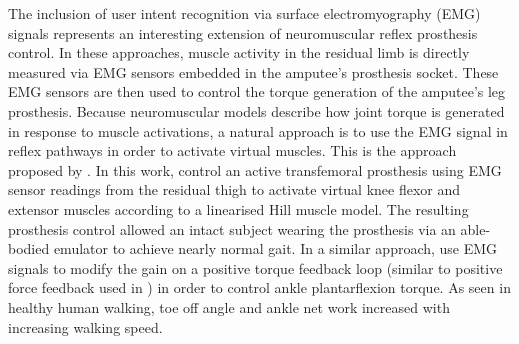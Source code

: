 The inclusion of user intent recognition via surface electromyography (EMG)
signals represents an interesting extension of neuromuscular reflex prosthesis
control. In these approaches, muscle activity in the residual limb is directly
measured via EMG sensors embedded in the amputee's prosthesis socket. These EMG
sensors are then used to control the torque generation of the amputee's leg
prosthesis. Because neuromuscular models describe how joint torque is generated
in response to muscle activations, a natural approach is to use the EMG signal
in reflex pathways in order to activate virtual muscles. This is the approach
proposed by \citet{wu2011electromyography}. In this work,
\citeauthor{wu2011electromyography} control an active transfemoral prosthesis
using EMG sensor readings from the residual thigh to activate virtual knee
flexor and extensor muscles according to a linearised Hill muscle model. The
resulting prosthesis control allowed an intact subject wearing the prosthesis
via an able-bodied emulator to achieve nearly normal gait. In a similar
approach, \citet{wang2013proportional} use EMG signals to modify the gain on a
positive torque feedback loop (similar to positive force feedback used in
\citet{geyer2010muscle}) in order to control ankle plantarflexion torque. As
seen in healthy human walking, toe off angle and ankle net work increased with
increasing walking speed.
